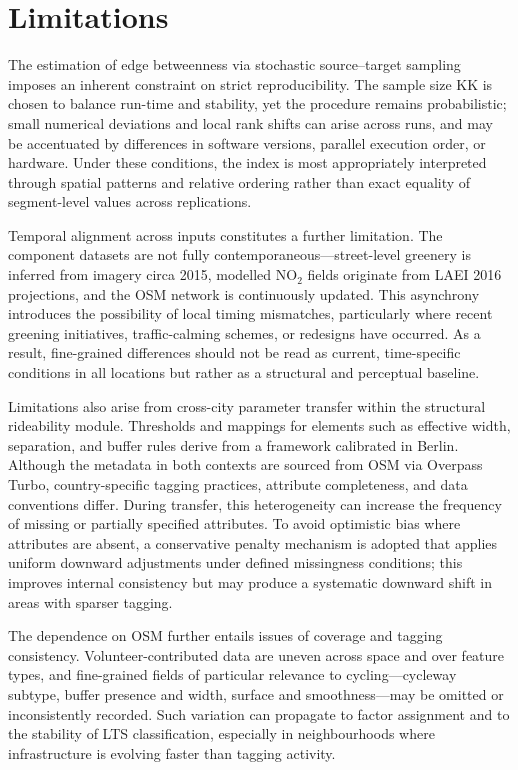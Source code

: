 \documentclass[
  12pt,
  oneside]{book}
\begin{document}
\section{Limitations}\label{limitations}

The estimation of edge betweenness via stochastic source--target sampling imposes an inherent constraint on strict reproducibility. The sample size KK is chosen to balance run-time and stability, yet the procedure remains probabilistic; small numerical deviations and local rank shifts can arise across runs, and may be accentuated by differences in software versions, parallel execution order, or hardware. Under these conditions, the index is most appropriately interpreted through spatial patterns and relative ordering rather than exact equality of segment-level values across replications.

Temporal alignment across inputs constitutes a further limitation. The component datasets are not fully contemporaneous---street-level greenery is inferred from imagery circa 2015, modelled NO\(_2\) fields originate from LAEI 2016 projections, and the OSM network is continuously updated. This asynchrony introduces the possibility of local timing mismatches, particularly where recent greening initiatives, traffic-calming schemes, or redesigns have occurred. As a result, fine-grained differences should not be read as current, time-specific conditions in all locations but rather as a structural and perceptual baseline.

Limitations also arise from cross-city parameter transfer within the structural rideability module. Thresholds and mappings for elements such as effective width, separation, and buffer rules derive from a framework calibrated in Berlin. Although the metadata in both contexts are sourced from OSM via Overpass Turbo, country-specific tagging practices, attribute completeness, and data conventions differ. During transfer, this heterogeneity can increase the frequency of missing or partially specified attributes. To avoid optimistic bias where attributes are absent, a conservative penalty mechanism is adopted that applies uniform downward adjustments under defined missingness conditions; this improves internal consistency but may produce a systematic downward shift in areas with sparser tagging.

The dependence on OSM further entails issues of coverage and tagging consistency. Volunteer-contributed data are uneven across space and over feature types, and fine-grained fields of particular relevance to cycling---cycleway subtype, buffer presence and width, surface and smoothness---may be omitted or inconsistently recorded. Such variation can propagate to factor assignment and to the stability of LTS classification, especially in neighbourhoods where infrastructure is evolving faster than tagging activity.
\end{document}
